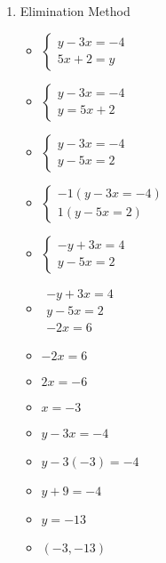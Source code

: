 \begin{enumerate}
\begin{enumerate}
  \item Elimination Method
    \begin{itemize}
    \item $\left\{ \begin{array}{l}
          y-3x=-4 \\
          5x+2=y \end{array} \right.$
    \item $\left\{ \begin{array}{l}
          y-3x=-4 \\
          y=5x+2 \end{array} \right.$
    \item $\left\{ \begin{array}{l}
          y-3x=-4 \\
          y-5x=2 \end{array} \right.$
    \item $\left\{ \begin{array}{l}
          -1(y-3x=-4) \\
          1(y-5x=2) \end{array} \right.$
    \item $\left\{ \begin{array}{l}
          -y+3x=4 \\
          y-5x=2 \end{array} \right.$
    \item $\begin{array}{l}
          -y+3x=4 \\
          y-5x=2 \\ \hline
          -2x=6 \end{array}$
    \item $-2x=6$
    \item $2x=-6$
    \item $x=-3$
    \item $y-3x=-4$
    \item $y-3(-3)=-4$
    \item $y+9=-4$
    \item $y=-13$
    \item $(-3,-13)$
    \end{itemize}
  \end{enumerate}
\end{enumerate}
